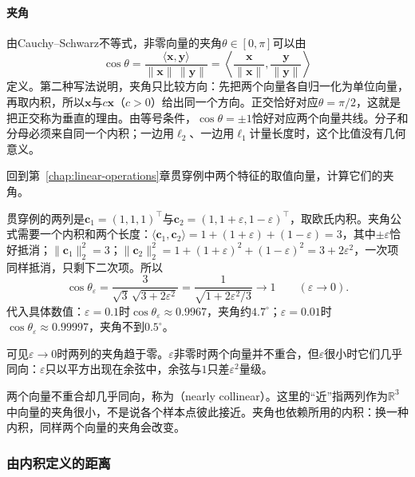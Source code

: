 \paragraph{夹角}
由Cauchy--Schwarz不等式，非零向量的夹角$\theta\in[0,\pi]$可以由
\[
 \cos\theta=\frac{\langle\bm x,\bm y\rangle}{\lVert\bm x\rVert\,\lVert\bm y\rVert}
 =\left\langle\frac{\bm x}{\lVert\bm x\rVert},\frac{\bm y}{\lVert\bm y\rVert}\right\rangle
\]
定义。第二种写法说明，夹角只比较方向：先把两个向量各自归一化为单位向量，再取内积，所以$\bm x$与$c\bm x$（$c>0$）给出同一个方向。正交恰好对应$\theta=\pi/2$，这就是把正交称为垂直的理由。由等号条件，$\cos\theta=\pm1$恰好对应两个向量共线。分子和分母必须来自同一个内积；一边用$\ell_2$、一边用$\ell_1$计量长度时，这个比值没有几何意义。

回到第~\ref{chap:linear-operations}章贯穿例中两个特征的取值向量，计算它们的夹角。
\begin{example}[贯穿例两列的夹角]
\label{ex:ls-nearly-collinear-angle}
贯穿例的两列是$\bm c_1=(1,1,1)^\top$与$\bm c_2=(1,1+\varepsilon,1-\varepsilon)^\top$，取欧氏内积。夹角公式需要一个内积和两个长度：$\langle\bm c_1,\bm c_2\rangle=1+(1+\varepsilon)+(1-\varepsilon)=3$，其中$\pm\varepsilon$恰好抵消；$\lVert\bm c_1\rVert_2^2=3$；$\lVert\bm c_2\rVert_2^2=1+(1+\varepsilon)^2+(1-\varepsilon)^2=3+2\varepsilon^2$，一次项同样抵消，只剩下二次项。所以
\begin{equation}
 \cos\theta_\varepsilon=\frac{3}{\sqrt3\,\sqrt{3+2\varepsilon^2}}
 =\frac{1}{\sqrt{1+2\varepsilon^2/3}}\longrightarrow1\qquad(\varepsilon\to0).
 \label{eq:linear-algebra-nearly-collinear-angle}
\end{equation}
代入具体数值：$\varepsilon=0.1$时$\cos\theta_\varepsilon\approx0.9967$，夹角约$4.7^\circ$；$\varepsilon=0.01$时$\cos\theta_\varepsilon\approx0.99997$，夹角不到$0.5^\circ$。

可见$\varepsilon\to0$时两列的夹角趋于零。$\varepsilon$非零时两个向量并不重合，但$\varepsilon$很小时它们几乎同向：$\varepsilon$只以平方出现在余弦中，余弦与$1$只差$\varepsilon^2$量级。
\end{example}
两个向量不重合却几乎同向，称为（nearly collinear）。这里的“近”指两列作为$\mathbb R^3$中向量的夹角很小，不是说各个样本点彼此接近。夹角也依赖所用的内积：换一种内积，同样两个向量的夹角会改变。

\subsubsection{由内积定义的距离}
\label{sec:ls-inner-product-distance}

